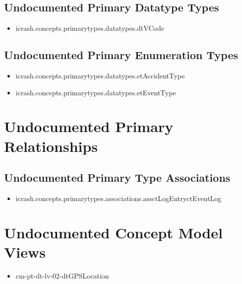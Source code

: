 \subsection[Undocumented Primary Datatype Types]{Undocumented Primary Datatype Types}
\begin{itemize}
\item icrash.concepts.primarytypes.datatypes.dtVCode 
\end{itemize}

\subsection[Undocumented Primary Enumeration Types]{Undocumented Primary Enumeration Types}
\begin{itemize}
\item icrash.concepts.primarytypes.datatypes.etAccidentType 
\item icrash.concepts.primarytypes.datatypes.etEventType 
\end{itemize}






\section[Undocumented Primary Type Relationships]{Undocumented Primary Relationships}

\subsection[Undocumented Primary Type Associations]{Undocumented Primary Type Associations}
\begin{itemize}
\item icrash.concepts.primarytypes.associations.assctLogEntryctEventLog 
\end{itemize}












\section[Undocumented Concept Model Views]{Undocumented Concept Model Views}
\begin{itemize}
\item cm-pt-dt-lv-02-dtGPSLocation 
\end{itemize}


